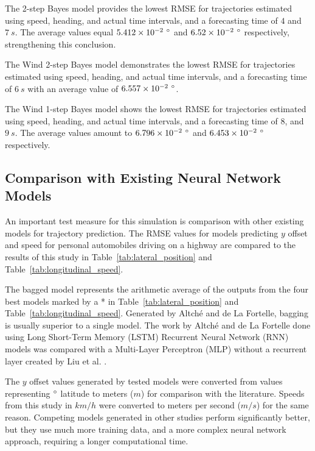 \documentclass[preprint,12pt]{elsarticle}
\begin{document}
The 2-step Bayes model provides the lowest RMSE for trajectories estimated using speed, heading, and actual time intervals, and a forecasting time of $4$ and $7 \ s$. The average values equal $5.412 \times 10^{-2} \ \degree$  and $6.52 \times 10^{-2} \ \degree$ respectively, strengthening this conclusion.

The Wind 2-step Bayes model demonstrates the lowest RMSE for trajectories estimated using speed, heading, and actual time intervals, and a forecasting time of $6 \ s$ with an average value of $6.557 \times 10^{-2} \ \degree$.

The Wind 1-step Bayes model shows the lowest RMSE for trajectories estimated using speed, heading, and actual time intervals, and a forecasting time of $8$, and $9 \ s$. The average values amount to $6.796 \times 10^{-2} \ \degree$ and $6.453 \times 10^{-2} \ \degree$ respectively.

\subsection{Comparison with Existing Neural Network Models}

An important test measure for this simulation is comparison with other existing models for trajectory prediction. The RMSE values for models predicting $y$ offset and speed for personal automobiles driving on a highway are compared to the results of this study in Table~\ref{tab:lateral_position} and Table~\ref{tab:longitudinal_speed}.

The bagged model represents the arithmetic average of the outputs from the four best models marked by a * in Table~\ref{tab:lateral_position} and Table~\ref{tab:longitudinal_speed}. Generated by Altché and de La Fortelle, bagging is usually superior to a single model. The work by Altché and de La Fortelle \cite{altche2017lstm} done using Long Short-Term Memory (LSTM) Recurrent Neural Network (RNN) models was compared with a Multi-Layer Perceptron (MLP) without a recurrent layer created by Liu et al. \cite{liu2014vehicle}.

The $y$ offset values generated by tested models were converted from values representing $\degree$ latitude to meters ($m$) for comparison with the literature. Speeds from this study in $km/h$ were converted to meters per second ($m/s$) for the same reason. Competing models generated in other studies perform significantly better, but they use much more training data, and a more complex neural network approach, requiring a longer computational time.
\end{document}
